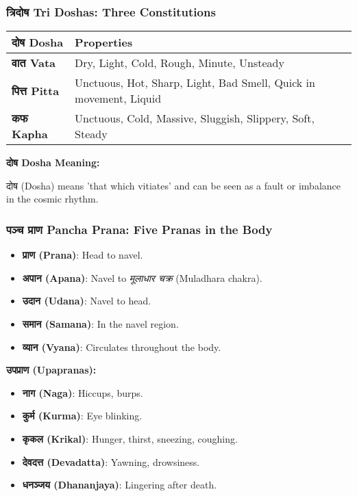 \begin{frame}[fragile]\frametitle{त्रिदोष  Tri Doshas: Three Constitutions}
    \begin{tabular}{|l|l|}
    \hline
    \textbf{दोष Dosha} & \textbf{Properties} \\
    \hline
    \textbf{वात  Vata} & Dry, Light, Cold, Rough, Minute, Unsteady \\
    \hline
    \textbf{पित्त Pitta} & Unctuous, Hot, Sharp, Light, Bad Smell, Quick in movement, Liquid \\
    \hline
    \textbf{कफ  Kapha} & Unctuous, Cold, Massive, Sluggish, Slippery, Soft, Steady \\
    \hline
    \end{tabular}
    \vspace{0.5cm}
    \textbf{दोष Dosha Meaning:}
    
    दोष (Dosha) means 'that which vitiates' and can be seen as a fault or imbalance in the cosmic rhythm.
    
\end{frame}

\begin{frame}[fragile]\frametitle{पञ्च  प्राण  Pancha Prana: Five Pranas in the Body}

	\begin{itemize} 
	\item \textbf{प्राण (Prana)}: Head to navel. 
	\item \textbf{अपान (Apana)}: Navel to \textit{मूलाधार चक्र} (Muladhara chakra). 
	\item \textbf{उदान (Udana)}: Navel to head. 
	\item \textbf{समान (Samana)}: In the navel region. 
	\item \textbf{व्यान (Vyana)}: Circulates throughout the body. 
	\end{itemize}

	\vspace{0.5cm} 
	
	\textbf{उपप्राण (Upapranas):} 
	\begin{itemize} 
	\item \textbf{नाग (Naga)}: Hiccups, burps. 
	\item \textbf{कुर्म (Kurma)}: Eye blinking. 
	\item \textbf{कृकल (Krikal)}: Hunger, thirst, sneezing, coughing. 
	\item \textbf{देवदत्त (Devadatta)}: Yawning, drowsiness. 
	\item \textbf{धनञ्जय (Dhananjaya)}: Lingering after death. 
	\end{itemize}
\end{frame}

